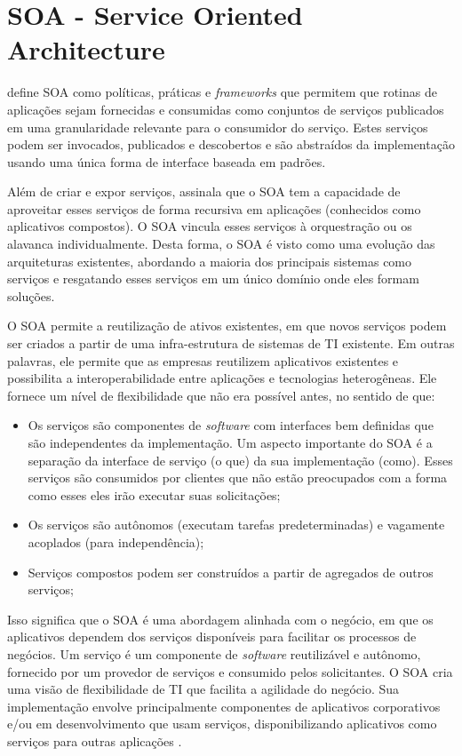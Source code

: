 \section{SOA - Service Oriented Architecture}\label{sec:soa}

 define SOA como políticas, práticas e \textit{frameworks} que permitem que rotinas de aplicações sejam fornecidas e consumidas como conjuntos de serviços publicados em uma granularidade relevante para o consumidor do serviço. Estes serviços podem ser invocados, publicados e descobertos e são abstraídos da implementação usando uma única forma de interface baseada em padrões.

Além de criar e expor serviços,  assinala que o SOA tem a capacidade de aproveitar esses serviços de forma recursiva em aplicações (conhecidos como aplicativos compostos). O SOA vincula esses serviços à orquestração ou os alavanca individualmente. Desta forma, o SOA é visto como uma evolução das arquiteturas existentes, abordando a maioria dos principais sistemas como serviços e resgatando esses serviços em um único domínio onde eles formam soluções.

 O SOA permite a reutilização de ativos existentes, em que novos serviços podem ser criados a partir de uma infra-estrutura de sistemas de TI existente. Em outras palavras, ele permite que as empresas reutilizem aplicativos existentes e possibilita a interoperabilidade entre aplicações e tecnologias heterogêneas. Ele fornece um nível de flexibilidade que não era possível antes, no sentido de que:

\begin{itemize}
    \item Os serviços são componentes de \textit{software} com interfaces bem definidas que são independentes da implementação. Um aspecto importante do SOA é a separação da interface de serviço (o que) da sua implementação (como). Esses serviços são consumidos por clientes que não estão preocupados com a forma como esses eles irão executar suas solicitações;
    \item Os serviços são autônomos (executam tarefas predeterminadas) e vagamente acoplados (para independência);
    \item Serviços compostos podem ser construídos a partir de agregados de outros serviços;
\end{itemize}

Isso significa que o SOA é uma abordagem alinhada com o negócio, em que os aplicativos dependem dos serviços disponíveis para facilitar os processos de negócios. Um serviço é um componente de \textit{software} reutilizável e autônomo, fornecido por um provedor de serviços e consumido pelos solicitantes. O SOA cria uma visão de flexibilidade de TI que facilita a agilidade do negócio. Sua implementação envolve principalmente componentes de aplicativos corporativos e/ou em desenvolvimento que usam serviços, disponibilizando aplicativos como serviços para outras aplicações \cite{soa-book}.

